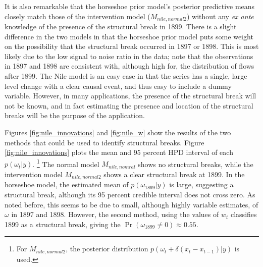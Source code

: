 \documentclass{article}
\DeclareMathOperator{\E}{E}
\begin{document}
It is also remarkable that the horseshoe prior model's posterior predictive means closely match those of the intervention model ($M_{nile,normal2}$) without any \textit{ex ante} knowledge of the presence of the structural break in 1899.
There is a slight difference in the two models in that the horseshoe prior model puts some weight on the possibility that the structural break occurred in 1897 or 1898.
This is most likely due to the low signal to noise ratio in the data; note that the observations in 1897 and 1898 are consistent with, although high for, the distribution of flows after 1899.
The Nile model is an easy case in that the series has a single, large level change with a clear causal event, and thus easy to include a dummy variable.
However, in many applications, the presence of the structural break will not be known, and in fact estimating the presence and location of the structural breaks will be the purpose of the application.

Figures \ref{fig:nile_innovations} and \ref{fig:nile_w} show the results of the two methods that could be used to identify structural breaks. 
Figure \ref{fig:nile_innovations} plots the mean and 95 percent HPD interval of each $p(\omega_{t} | y)$.%
\footnote{For $M_{nile,normal2}$, the posterior distribution $p(\omega_{t} + \delta (x_{t} - x_{t-1}) | y)$ is used.}
The normal model $M_{nile,nomral}$ shows no structural breaks, while the intervention model $M_{nile,normal2}$ shows a clear structural break at 1899.
In the horseshoe model, the estimated mean of $p(\omega_{1899} | y)$ is large, suggesting a structural break, although its 95 percent credible interval does not cross zero.
As noted before, this seems to be due to small, although highly variable estimates, of $\omega$ in 1897 and 1898.
However, the second method, using the values of $w_{t}$ classifies 1899 as a structural break, giving the $\Pr(\omega_{1899} \neq 0) \approx 0.55$.


\end{document}
